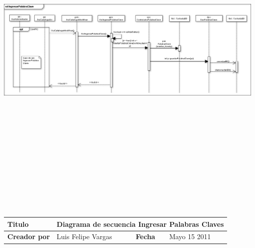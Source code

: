 				\begin{minipage}[c]{1\linewidth}
				\centering
    			\includegraphics[width=21cm, height=17cm, angle=90]
    			{diagramasSecuencia/IngresarPalabrasClave}\\[0.5cm]
    			
    			\begin{tabular}{|p{0.225\textwidth}|p{}|p{}
    			|p{}|}
			    \hline
			    {\bf Titulo} & 
			    \multicolumn{3}{p{0.675\textwidth}|}{Diagrama de secuencia Ingresar Palabras Claves}\\
			    \hline
			    \hline
			    {\bf Creador por} & {Luis Felipe Vargas} & {\bf Fecha} & {Mayo 15 2011}\\
			    \hline
			    \end{tabular}
			    \end{minipage}
			    
			
